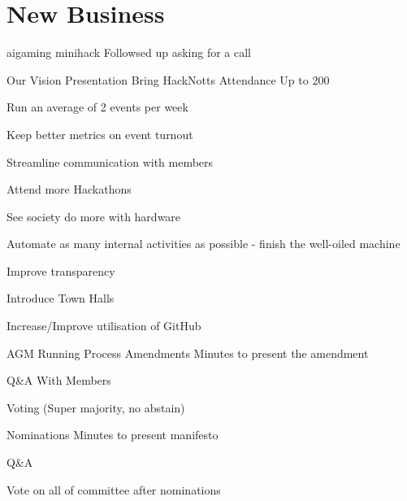 \documentclass[11pt,hacksoc]{meetingmins}
\begin{document}
\section{New Business}
\begin{items}
	\item
	aigaming minihack
		\subitem
		Followsed up asking for a call
		
	\item
	Our Vision Presentation
		\subitem
		Bring HackNotts Attendance Up to 200
		
		\subitem
		Run an average of 2 events per week
		
		\subitem
		Keep better metrics on event turnout
		
		\subitem
		Streamline communication with members
		
		\subitem
		Attend more Hackathons
		
		\subitem
		See society do more with hardware
		
		\subitem
		Automate as many internal activities as possible - finish the well-oiled machine
		
		\subitem
		Improve transparency
		
		\subitem
		Introduce Town Halls
		
		\subitem
		Increase/Improve utilisation of GitHub

	\item
	AGM Running Process
		\subitem
		Amendments
			 Minutes to present the amendment
			
			\subsubitem
			Q\&A With Members
			
			\subsubitem
			Voting (Super majority, no abstain)
			
		\subitem
		Nominations
			 Minutes to present manifesto
			
			\subsubitem
			Q\&A
			
			\subsubitem
			Vote on all of committee after nominations
		
\end{items}

\vspace{1em}
\end{document}

